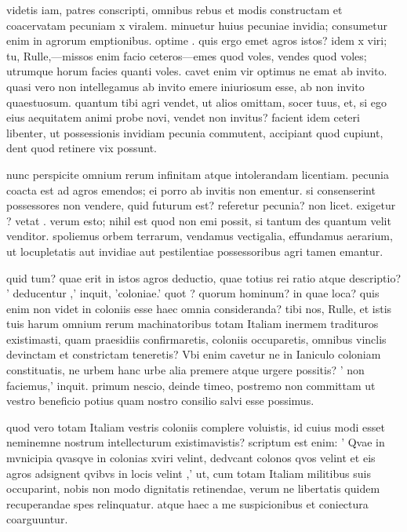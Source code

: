  videtis iam, patres conscripti, omnibus rebus et modis constructam et coacervatam pecuniam x viralem. minuetur huius pecuniae invidia; consumetur enim in agrorum emptionibus. optime . quis ergo emet agros istos? idem x viri; tu, Rulle,—missos enim facio ceteros—emes quod voles, vendes quod voles; utrumque horum facies quanti voles. cavet enim vir optimus ne emat ab invito. quasi vero non intellegamus ab invito emere iniuriosum esse, ab non invito quaestuosum. quantum tibi agri vendet, ut alios omittam, socer tuus, et, si ego eius aequitatem animi probe novi, vendet non invitus? facient idem ceteri libenter, ut possessionis invidiam pecunia commutent, accipiant quod cupiunt, dent quod retinere vix possunt.

 nunc perspicite omnium rerum infinitam atque intolerandam licentiam. pecunia coacta est ad agros emendos; ei porro ab invitis non ementur. si consenserint possessores non vendere, quid futurum est? referetur pecunia? non licet. exigetur ? vetat . verum esto; nihil est quod non emi possit, si tantum des quantum velit venditor. spoliemus orbem terrarum, vendamus vectigalia, effundamus aerarium, ut locupletatis aut invidiae aut pestilentiae possessoribus agri tamen emantur.

 quid tum? quae erit in istos agros deductio, quae totius rei ratio atque descriptio? ' deducentur ,' inquit, 'coloniae.' quot ? quorum hominum? in quae loca? quis enim non videt in coloniis esse haec omnia consideranda? tibi nos, Rulle, et istis tuis harum omnium rerum machinatoribus totam Italiam inermem tradituros existimasti, quam praesidiis confirmaretis, coloniis occuparetis, omnibus vinclis devinctam et constrictam teneretis? Vbi enim cavetur ne in Ianiculo coloniam constituatis, ne urbem hanc urbe alia premere atque urgere possitis? ' non faciemus,' inquit. primum nescio, deinde timeo, postremo non committam ut vestro beneficio potius quam nostro consilio salvi esse possimus.

 quod vero totam Italiam vestris coloniis complere voluistis, id cuius modi esset neminemne nostrum intellecturum existimavistis? scriptum est enim: ' Qvae in mvnicipia qvasqve in colonias xviri velint, dedvcant colonos qvos velint et eis agros adsignent qvibvs in locis velint ,' ut, cum totam Italiam militibus suis occuparint, nobis non modo dignitatis retinendae, verum ne libertatis quidem recuperandae spes relinquatur. atque haec a me suspicionibus et coniectura coarguuntur.

